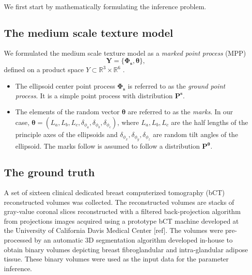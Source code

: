 \documentclass[journal]{IEEEtran}
\begin{document}
We first start by mathematically formulating the inference problem.

\subsection{The medium scale texture model}
\label{chap4-sec1-sub1:math-form-medi}

We formulated the medium scale texture model as a \textit{marked point
  process} (MPP)
$$
\mathbf{Y} = \{ \mathbf{\Phi_{s}},\boldsymbol{\theta} \},
$$
defined on
a product space $Y \subset \mathbb{R}^{3} \times \mathbb{R}^6$
\cite{chiu2013stochastic}.

\begin{itemize}

\item The ellipsoid center point process $\mathbf{\Phi_s}$ is referred
  to as the \textit{ground point process}. It is a simple point
  process with distribution $\mathbf{P}^{\mathbf{s}}$.

\item The elements of the random vector $\boldsymbol{\theta}$ are
  referred to as the \textit{marks}. In our case,
  $\boldsymbol{\theta} = \left( L_a, L_b, L_c, \delta_{\phi_a},
    \delta_{\phi_b}, \delta_{\phi_c} \right)$, where $L_a, L_b, L_c$
  are the half lengths of the principle axes of the ellipsoids and
  $\delta_{\phi_{x}},\delta_{\phi_{y}},\delta_{\phi_{z}}$ are random
  tilt angles of the ellipsoid. The marks follow is assumed to follow
  a distribution $\mathbf{P}^{\boldsymbol{\theta}}$.
\end{itemize}

\subsection{The ground truth}
\label{chap4-sec1-sub2:ground-truth}

A set of sixteen clinical dedicated breast computerized tomography
(bCT) reconstructed volumes was collected. The reconstructed volumes
are stacks of gray-value coronal slices reconstructed with a filtered
back-projection algorithm from projections images acquired using a
prototype bCT machine developed at the University of California Davis
Medical Center [ref]. The volumes were pre-processed by an automatic
3D segmentation algorithm developed in-house to obtain binary volumes
depicting breast fibroglandular and intra-glandular adipose
tissue. These binary volumes were used as the input data for the
parameter inference.
\end{document}
